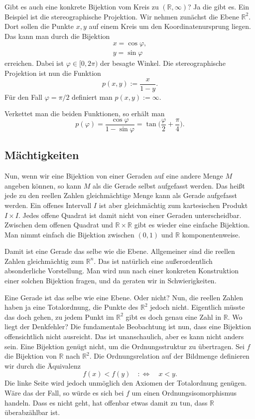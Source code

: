 \documentclass[a4paper,11pt,fleqn,twocolumn,twoside]{article}
\newcommand{\R}{\mathbb R}
\begin{document}
Gibt es auch eine konkrete Bijektion vom Kreis zu
$(\R,\infty)$? Ja die gibt es. Ein Beispiel ist die
stereographische Projektion. Wir nehmen zunächst die Ebene
$\R^2$. Dort sollen die Punkte $x,y$ auf einem Kreis
um den Koordinatenursprung liegen. Das kann man durch die Bijektion
\begin{gather}
x=\cos\varphi,\\
y=\sin\varphi
\end{gather}
erreichen. Dabei ist $\varphi\in{[0,2\pi)}$ der besagte Winkel.
Die stereographische Projektion ist nun die Funktion
\begin{equation}
p(x,y) := \frac{x}{1-y}.
\end{equation}
Für den Fall $\varphi=\pi/2$ definiert man $p(x,y):=\infty$.

Verkettet man die beiden Funktionen, so erhält man
\begin{equation}
p(\varphi) = \frac{\cos\varphi}{1-\sin\varphi}
= \tan\Big(\frac{\varphi}{2}+\frac{\pi}{4}\Big).
\end{equation}

\subsection{Mächtigkeiten}

Nun, wenn wir eine Bijektion von einer Geraden auf eine andere Menge
$M$ angeben können, so kann $M$ als die Gerade selbst aufgefasst
werden. Das heißt jede zu den reellen Zahlen gleichmächtige Menge
kann als Gerade aufgefasst werden. Ein offenes Intervall $I$ ist
aber gleichmächtig zum kartesischen Produkt $I\times I$. Jedes
offene Quadrat ist damit nicht von einer Geraden unterscheidbar.
Zwischen dem offenen Quadrat und $\R\times\R$ gibt
es wieder eine einfache Bijektion. Man nimmt einfach die Bijektion
zwischen $(0,1)$ und $\R$ komponentenweise.

Damit ist eine Gerade das selbe wie die Ebene. Allgemeiner sind die
reellen Zahlen gleichmächtig zum $\R^n$. Das ist natürlich
eine außerordentlich absonderliche Vorstellung. Man wird nun nach
einer konkreten Konstruktion einer solchen Bijektion fragen, und
da geraten wir in Schwierigkeiten.

Eine Gerade ist das selbe wie eine Ebene. Oder nicht? Nun, die reellen
Zahlen haben ja eine Totalordnung, die Punkte des $\R^2$
jedoch nicht. Eigentlich müsste das doch gehen, zu jedem Punkt
im $\R^2$ gibt es doch genau eine Zahl in $\R$. Wo
liegt der Denkfehler? Die fundamentale Beobachtung ist nun, dass eine
Bijektion offensichtlich nicht ausreicht. Das ist unanschaulich, aber
es kann nicht anders sein. Eine Bijektion genügt nicht, um die
Ordnungsstruktur zu übertragen. Sei $f$ die Bijektion von
$\R$ nach $\R^2$. Die Ordnungsrelation auf der
Bildmenge definieren wir durch die Äquivalenz
\begin{equation}
f(x)<f(y)\quad:\Longleftrightarrow\quad x<y.
\end{equation}
Die linke Seite wird jedoch unmöglich den Axiomen der Totalordnung
genügen. Wäre das der Fall, so würde es sich bei $f$ um einen
Ordnungsisomorphismus handeln. Dass es nicht geht, hat offenbar etwas
damit zu tun, dass $\R$ überabzählbar ist.
\end{document}
